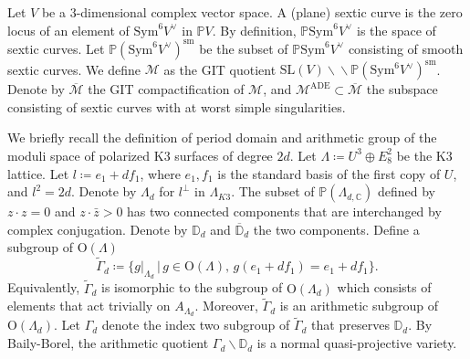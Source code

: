 \documentclass[12pt,reqno,a4paper]{amsart}
\theoremstyle{remark}
\theoremstyle{definition}
\newcommand{\CC}{\mathbb{C}}
\newcommand{\PP}{\mathbb{P}}
\newcommand{\DD}{\mathbb{D}}
\newcommand{\calM}{\mathcal{M}}
\newcommand\Sym{\mathrm{Sym}}
\newcommand\SL{\mathrm{SL}}
\newcommand\Or{\mathrm{O}}
\newcommand{\bs}{\backslash}
\newcommand{\dbs}{\bs\!\! \bs}
\begin{document}
Let $V$ be a $3$-dimensional complex vector space.
A (plane) sextic curve is the zero locus of an element of $\Sym^6 V^\vee$ in $\PP V$.
By definition, $\PP\Sym^6 V^\vee$ is the space of sextic curves. 
Let $\PP(\Sym^6 V^\vee)^{\mathrm{sm}}$ be the subset of $\PP\Sym^6 V^\vee$ consisting of smooth sextic curves.
We define $\calM$ as the GIT quotient $\SL(V)\dbs\PP(\Sym^6 V^\vee)^{\mathrm{sm}}$.
Denote by $\overline{\calM}$ the GIT compactification of $\calM$, and $\calM^{\mathrm{ADE}}\subset \overline{\calM}$ the subspace consisting of sextic curves with at worst simple singularities.

We briefly recall the definition of period domain and arithmetic group of the moduli space of polarized K3 surfaces of degree $2d$.
Let $\Lambda\coloneqq U^3\oplus E_8^2$ be the K3 lattice.
Let $l\coloneqq e_1+df_1$, where $e_1,f_1$ is the standard basis of the first copy of $U$, and $l^2=2d$.
Denote by $\Lambda_d$ for $l^{\perp}$ in $\Lambda_{K3}$.
The subset of $\PP(\Lambda_{d,\CC})$ defined by $z\cdot z=0$ and $z\cdot\bar{z}>0$ has two connected components that are interchanged by complex conjugation. Denote by $\DD_d$ and $\overline{\DD}_d$ the two components.
Define a subgroup of $\Or(\Lambda)$
\begin{equation*}
    \widetilde\Gamma_d\coloneqq \{ g|_{\Lambda_d} \,\big|\, g\in \Or(\Lambda),\, g(e_1+df_1)=e_1+df_1 \}.
\end{equation*}
Equivalently, $\widetilde\Gamma_d$ is isomorphic to the subgroup of $\Or(\Lambda_d)$ which consists of elements that act trivially on $A_{\Lambda_d}$.
Moreover, $\widetilde\Gamma_d$ is an arithmetic subgroup of $\Or(\Lambda_d)$.
Let $\Gamma_d$ denote the index two subgroup of $\widetilde\Gamma_d$ that preserves $\DD_d$.
By Baily-Borel, the arithmetic quotient $\Gamma_d\bs\DD_d$ is a normal quasi-projective variety.

\end{document}
